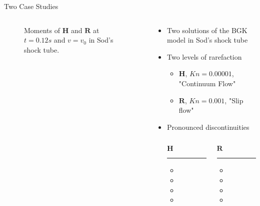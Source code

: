 \documentclass[usenames,dvipsnames,Nike,mathserif]{tuberlinbeamer}
\begin{document}
\begin{frame}[fragile]{Two Case Studies}
	\begin{columns}
		\begin{column}{.5\textwidth}
			\begin{figure}
				
				\caption{Moments of $\mathbf{H}$ and $\mathbf{R}$ at $t=0.12s$ and $v=v_0$ in Sod's shock tube.}
			\end{figure}
		\end{column}
		\begin{column}{.5\textwidth}
			\begin{itemize}
				\item<1-> Two solutions of the BGK model in Sod's shock tube
				\item<2-> Two levels of rarefaction
				\begin{itemize}
					\item $\mathbf{H}$, $Kn=0.00001$, "Continuum Flow"
					\item $\mathbf{R}$, $Kn=0.001$, "Slip flow"
				\end{itemize}
				\item<3-> Pronounced discontinuities
			\begin{columns}
				\begin{column}{.3\textwidth}
					$\mathbf{H}$
					\hrule
					\begin{itemize}
						\item {}
						\item {}
						\item {}
						\item {}
					\end{itemize}
				\end{column}
				\begin{column}{.3\textwidth}
					$\mathbf{R}$
					\hrule
					\begin{itemize}
						\item {}
						\item {}
						\item {}
						\item {}
					\end{itemize}
				\end{column}
			\end{columns}
			\end{itemize}
		\end{column}
	\end{columns}
\end{frame}
\end{document}

